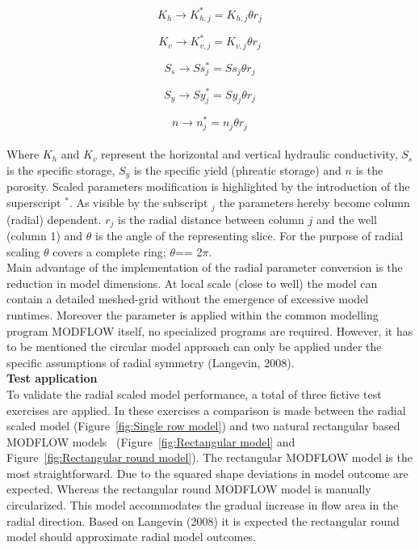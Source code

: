 \begin{equation}
 K_{h}  \rightarrow K_{h,j}^{*} =  K_{h,j} \theta r_{j}
\end{equation}

\begin{equation}
 K_{v}  \rightarrow K_{v,j}^{*} = K_{v,j} \theta r_{j} 
\end{equation}

\begin{equation}
 S_{s}  \rightarrow Ss_{j}^{*} = Ss_{j} \theta r_{j} 
\end{equation}

\begin{equation}
 S_{y}  \rightarrow Sy_{j}^{*} = Sy_{j} \theta r_{j} 
\end{equation}

\begin{equation}
 n   \rightarrow n_{j}^{*} = n_{j} \theta r_{j} 
\end{equation}
\\
Where $K_h$ and $K_v$ represent the horizontal and vertical hydraulic conductivity, $S_s$ is the specific storage, $S_y$ is the specific yield (phreatic storage) and $n$ is the porosity. Scaled parameters modification is highlighted by the introduction of the superscript $^*$. As visible by the subscript $_j$ the parameters hereby become column (radial) dependent. $r_j$ is the radial distance between column $j$ and the well (column 1) and $\theta$ is the angle of the representing slice. For the purpose of radial scaling $\theta$ covers a complete ring; $\theta$== 2$\pi$.
\bigskip \\ 
Main advantage of the implementation of the radial parameter conversion is the reduction in model dimensions. At local scale (close to well) the model can contain a detailed meshed-grid without the emergence of excessive model runtimes. Moreover the parameter is applied within the common modelling program MODFLOW itself, no specialized programs are required. However, it has to be mentioned the circular model approach can only be applied under the specific assumptions of radial symmetry (Langevin, 2008).  
\bigskip \\
\textbf{Test application}\\
To validate the radial scaled model performance, a total of three fictive test exercises are applied. In these exercises a comparison is made between the radial scaled model (Figure~\ref{fig:Single row model}) and two natural rectangular based MODFLOW models \ (Figure~\ref{fig:Rectangular model} and Figure~\ref{fig:Rectangular round model}). The rectangular MODFLOW model is the most straightforward. Due to the squared shape deviations in model outcome are expected. Whereas the rectangular round MODFLOW model is manually circularized. This model accommodates the gradual increase in flow area in the radial direction. Based on Langevin (2008) it is expected the rectangular round model should approximate radial model outcomes. 
